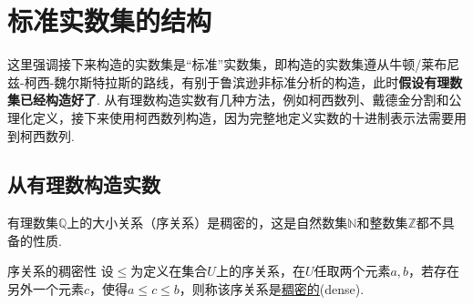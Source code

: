 \documentclass[main.tex]{subfiles}
\begin{document}
\section{标准实数集的结构}

这里强调接下来构造的实数集是“标准”实数集，即构造的实数集遵从牛顿/莱布尼兹-柯西-魏尔斯特拉斯的路线，有别于鲁滨逊非标准分析的构造，此时\textbf{假设有理数集已经构造好了}. 从有理数构造实数有几种方法，例如柯西数列、戴德金分割和公理化定义，接下来使用柯西数列构造，因为完整地定义实数的十进制表示法需要用到柯西数列.


\subsection{从有理数构造实数}

有理数集\(\mathbb{Q}\)上的大小关系（序关系）是稠密的，这是自然数集\(\mathbb{N}\)和整数集\(\mathbb{Z}\)都不具备的性质.

\begin{definition}{序关系的稠密性}
    设\(\leq\)为定义在集合\(U\)上的序关系，在\(U\)任取两个元素\(a,b\)，若存在另外一个元素\(c\)，使得\(a\leq c \leq b\)，则称该序关系是\uline{稠密的}(dense).
\end{definition}
\end{document}
